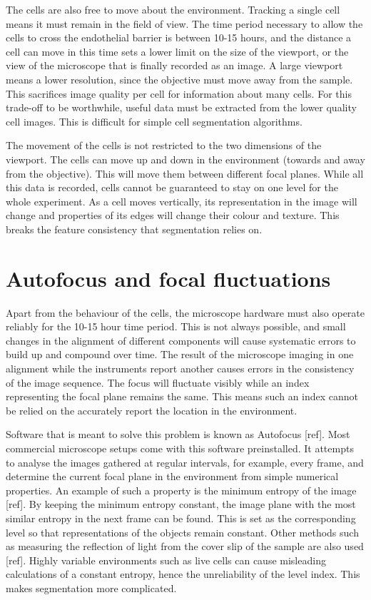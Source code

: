 The cells are also free to move about the environment. Tracking a single cell means it must remain in the field of view. The time period necessary to allow the cells to cross the endothelial barrier is between 10-15 hours, and the distance a cell can move in this time sets a lower limit on the size of the viewport, or the view of the microscope that is finally recorded as an image. A large viewport means a lower resolution, since the objective must move away from the sample. This sacrifices image quality per cell for information about many cells. For this trade-off to be worthwhile, useful data must be extracted from the lower quality cell images. This is difficult for simple cell segmentation algorithms.

The movement of the cells is not restricted to the two dimensions of the viewport. The cells can move up and down in the environment (towards and away from the objective). This will move them between different focal planes. While all this data is recorded, cells cannot be guaranteed to stay on one level for the whole experiment. As a cell moves vertically, its representation in the image will change and properties of its edges will change their colour and texture. This breaks the feature consistency that segmentation relies on.

\section{Autofocus and focal fluctuations}

Apart from the behaviour of the cells, the microscope hardware must also operate reliably for the 10-15 hour time period. This is not always possible, and small changes in the alignment of different components will cause systematic errors to build up and compound over time. The result of the microscope imaging in one alignment while the instruments report another causes errors in the consistency of the image sequence. The focus will fluctuate visibly while an index representing the focal plane remains the same. This means such an index cannot be relied on the accurately report the location in the environment.

Software that is meant to solve this problem is known as Autofocus [ref]. Most commercial microscope setups come with this software preinstalled. It attempts to analyse the images gathered at regular intervals, for example, every frame, and determine the current focal plane in the environment from simple numerical properties. An example of such a property is the minimum entropy of the image [ref]. By keeping the minimum entropy constant, the image plane with the most similar entropy in the next frame can be found. This is set as the corresponding level so that representations of the objects remain constant. Other methods such as measuring the reflection of light from the cover slip of the sample are also used [ref]. Highly variable environments such as live cells can cause misleading calculations of a constant entropy, hence the unreliability of the level index. This makes segmentation more complicated.
